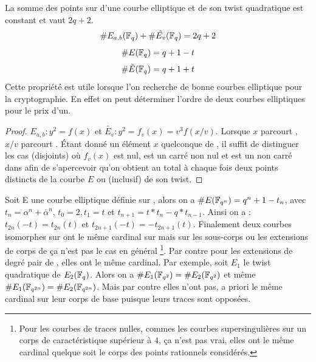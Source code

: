 \begin{propriete}
La somme des points sur  d'une courbe elliptique et de son twist quadratique est constant et vaut $2q + 2$.
\begin{equation}
\#E_{a, b}(\mathbb{F}_{q}) + \#\tilde{E_v}(\mathbb{F}_{q}) = 2q + 2
\end{equation}
\begin{equation}
\#E(\mathbb{F}_{q}) = q + 1 - t
\end{equation}
\begin{equation}
\#\tilde{E}(\mathbb{F}_{q}) = q + 1 + t
\end{equation}
Cette propriété est utile lorsque l'on recherche de bonne courbes elliptique pour la cryptographie. En effet on peut déterminer l'ordre de deux courbes elliptiques pour le prix d'un.
\end{propriete}
\begin{proof}
$E_{a, b} : y^2 = f(x)$ et $\tilde{E_v} : y^2 = f_v(x) = v^3 f(x/v)$. Lorsque $x$ parcourt , $x/v$ parcourt . \'Etant donné un élément $x$ quelconque de \GF{}, il suffit de distinguer les cas (disjoints) où $f_v(x)$ est nul, est un carré non nul et est un non carré dans  afin de s'apercevoir qu'on obtient au total à chaque fois deux points distincts de la courbe $E$ ou (inclusif) de son twist. 
\end{proof}


\begin{theoreme}
Soit E une courbe elliptique définie sur , alors on a $\# E(\mathbb{F}_{q^n}) = q^n + 1 - t_n$, avec $t_n = \alpha^n + \overline{\alpha}^n$, $t_0 = 2, t_1 = t$ et $t_{n+1} = t*t_n - q*t_{n-1}$.
Ainsi on a : $t_{2n}(-t) = t_{2n}(t)$ et $t_{2n+1}(-t) = -t_{2n+1}(t)$.
Finalement deux courbes isomorphes sur  ont le même cardinal sur  mais sur les sous-corps ou les extensions de corps de  ça n'est pas le cas en général \footnote{Pour les courbes de traces nulles, commes les courbes supersingulières sur un corps de caractéristique supérieur à $4$, ça n'est pas vrai, elles ont le même cardinal quelque soit le corps des points rationnels considérés.}. Par contre pour les extensions de degré pair de , elles ont le même cardinal.
Par exemple, soit $E_1$ le twist quadratique de $E_2(\mathbb{F}_{q})$. Alors on a $\# E_1(\mathbb{F}_{q^2}) = \# E_2(\mathbb{F}_{q^2})$ et même $\# E_1(\mathbb{F}_{q^{2n}}) = \# E_2(\mathbb{F}_{q^{2n}})$. Mais par contre elles n'ont pas, a priori le même cardinal sur leur corps de base puisque leurs traces sont opposées.
\end{theoreme}


